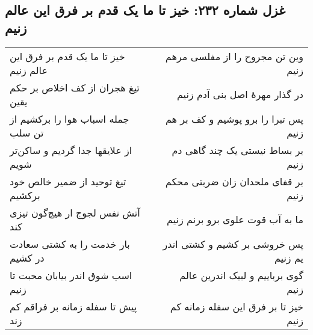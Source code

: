 \begin{center}
\section*{غزل شماره ۲۳۲: خیز تا ما یک قدم بر فرق این عالم زنیم}
\label{sec:232}
\begin{longtable}{l p{0.5cm} r}
خیز تا ما یک قدم بر فرق این عالم زنیم
&&
وین تن مجروح را از مفلسی مرهم زنیم
\\
تیغ هجران از کف اخلاص بر حکم یقین
&&
در گذار مهرهٔ اصل بنی آدم زنیم
\\
جمله اسباب هوا را برکشیم از تن سلب
&&
پس تبرا را برو پوشیم و کف بر هم زنیم
\\
از علایقها جدا گردیم و ساکن‌تر شویم
&&
بر بساط نیستی یک چند گاهی دم زنیم
\\
تیغ توحید از ضمیر خالص خود برکشیم
&&
بر قفای ملحدان زان ضربتی محکم زنیم
\\
آتش نفس لجوج ار هیچ‌گون تیزی کند
&&
ما به آب قوت علوی برو برنم زنیم
\\
بار خدمت را به کشتی سعادت در کشیم
&&
پس خروشی بر کشیم و کشتی اندر یم زنیم
\\
اسب شوق اندر بیابان محبت تا زنیم
&&
گوی برباییم و لبیک اندرین عالم زنیم
\\
پیش تا سفله زمانه بر فراقم کم زند
&&
خیز تا بر فرق این سفله زمانه کم زنیم
\\
\end{longtable}
\end{center}
